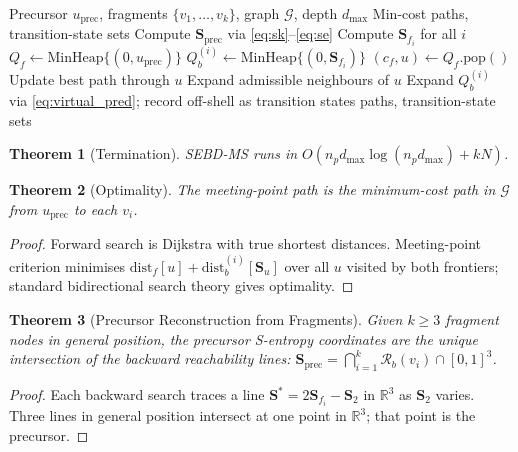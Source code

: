 \documentclass[twocolumn,10pt,a4paper]{article}
\theoremstyle{thmstyle}
\newtheorem{theorem}{Theorem}[section]
\theoremstyle{definition}
\theoremstyle{remark}
\newcommand{\R}{\mathbb{R}}
\newcommand{\Sv}{\mathbf{S}}
\newcommand{\calG}{\mathcal{G}}
\newcommand{\Reachb}{\mathcal{R}_b}
\begin{document}
\begin{algorithm}[h]
\caption{SEBD-MS: S-Entropy Bidirectional Dijkstra}
\begin{algorithmic}[1]
\REQUIRE Precursor $u_\text{prec}$, fragments $\{v_1,\ldots,v_k\}$,
         graph $\calG$, depth $d_\text{max}$
\ENSURE Min-cost paths, transition-state sets
\STATE Compute $\Sv_\text{prec}$ via \eqref{eq:sk}--\eqref{eq:se}
\STATE Compute $\Sv_{f_i}$ for all $i$
\STATE $Q_f \leftarrow \text{MinHeap}\{(0, u_\text{prec})\}$
  \STATE $Q_b^{(i)} \leftarrow \text{MinHeap}\{(0, \Sv_{f_i})\}$
\ENDFOR
{}
  \STATE $(c_f, u) \leftarrow Q_f.\text{pop}()$
    \IF{$\Sv_u \in \text{visited}_b^{(i)}$}
      \STATE Update best path through $u$
    \ENDIF
  \ENDFOR
  \STATE Expand admissible neighbours of $u$
\ENDWHILE
{}
  \STATE Expand $Q_b^{(i)}$ via \eqref{eq:virtual_pred}; record off-shell as transition states
\ENDFOR
\RETURN paths, transition-state sets
\end{algorithmic}
\end{algorithm}

\begin{theorem}[Termination]
SEBD-MS runs in $O(n_p d_\text{max} \log(n_p d_\text{max}) + kN)$.
\end{theorem}

\begin{theorem}[Optimality]
The meeting-point path is the minimum-cost path in $\calG$ from
$u_\text{prec}$ to each $v_i$.
\end{theorem}

\begin{proof}
Forward search is Dijkstra with true shortest distances. Meeting-point
criterion minimises $\text{dist}_f[u] + \text{dist}_b^{(i)}[\Sv_u]$
over all $u$ visited by both frontiers; standard bidirectional search
theory \citep{dijkstra1959,pohl1969} gives optimality.
\end{proof}

\begin{theorem}[Precursor Reconstruction from Fragments]
\label{thm:reconstruction}
Given $k \geq 3$ fragment nodes in general position, the precursor
S-entropy coordinates are the unique intersection of the backward
reachability lines:
$\Sv_\text{prec} = \bigcap_{i=1}^{k} \Reachb(v_i) \cap [0,1]^3$.
\end{theorem}

\begin{proof}
Each backward search traces a line $\Sv^* = 2\Sv_{f_i} - \Sv_2$ in $\R^3$
as $\Sv_2$ varies. Three lines in general position intersect at one point
in $\R^3$; that point is the precursor.
\end{proof}
\end{document}
